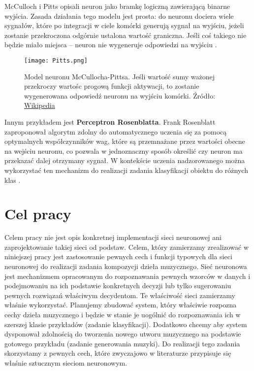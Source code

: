 McCulloch i Pitts opisali neuron jako bramkę logiczną zawierającą binarne wyjścia. Zasada działania tego modelu jest prosta: do neuronu dociera wiele sygnałów, które po integracji w ciele komórki generują sygnał na wyjściu, jeżeli zostanie przekroczona odgórnie ustalona wartość graniczna. Jeśli coś takiego nie będzie miało miejsca -- neuron nie wygeneruje odpowiedzi na wyjściu \citep[s. 40]{Raschka_2019}.
\begin{figure}[H]
\begin{center}
\texttt{[image: Pitts.png]}
\caption{Model neuronu McCullocha-Pittsa. Jeśli wartość sumy ważonej przekroczy wartośc progową funkcji aktywacji, to zostanie wygenerowana odpowiedź neuronu na wyjściu komórki. Źródło: \href{https://pl.wikipedia.org/wiki/Neuron_McCullocha-Pittsa}{Wikipedia}}
\centering
\end{center}
\end{figure}
Innym przykładem jest \textbf{Perceptron Rosenblatta}. Frank Rosenblatt zaproponował algorytm zdolny do automatycznego uczenia się za pomocą optymalnych współczynników wag, które są przemnażane przez wartości obecne na wejściu neuronu, co pozwala w jednoznaczny sposób określić czy neuron ma przekazać dalej otrzymany sygnał. W kontekście uczenia nadzorowanego można wykorzystać ten mechanizm do realizacji zadania klasyfikacji obiektu do różnych klas \citep[s.40]{Raschka_2019}.

\section{Cel pracy}

Celem pracy nie jest opis konkretnej implementacji sieci neuronowej ani zaprojektowanie takiej sieci od podstaw. Celem, który zamierzamy zrealizować w niniejszej pracy jest  zastosowanie pewnych cech i funkcji typowych dla sieci neuronowej do realizacji zadania kompozycji dzieła muzycznego. Sieć neuronowa jest mechanizmem opracowanym do rozpoznawania pewnych wzorców w danych i podejmowaniu na ich podstawie konkretnych decyzji lub tylko sugerowaniu pewnych rozwiązań właściwym decydentom. Te właściwość sieci zamierzamy właśnie wykorzystać. Planujemy zbudować system, który właściwie rozpozna cechy dzieła muzycznego i będzie w stanie je uogólnić do rozpoznawania ich  w szerszej klasie przykładów (zadanie klasyfikacji). Dodatkowo chcemy aby system dysponował zdolnością do tworzenia nowego utworu muzycznego na podstawie gotowego przykładu (zadanie generowania muzyki). Do realizacji tego zadania skorzystamy z pewnych cech, które zwyczajowo w literaturze przypisuje się właśnie sztucznym sieciom neuronowym.   
